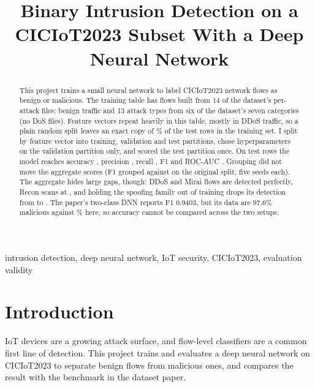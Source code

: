 \documentclass[conference]{IEEEtran}
\begin{document}
\title{Binary Intrusion Detection on a CICIoT2023 Subset With a Deep Neural Network}

\author{
}

\maketitle

\begin{abstract}
This project trains a small neural network to label CICIoT2023 network flows as benign or malicious. The training table has \DupRows{} flows built from 14 of the dataset's per-attack files: benign traffic and 13 attack types from six of the dataset's seven categories (no DoS files). Feature vectors repeat heavily in this table, mostly in DDoS traffic, so a plain random split leaves an exact copy of \DupSeenOrigPct\% of the test rows in the training set. I split by feature vector into training, validation and test partitions, chose hyperparameters on the validation partition only, and scored the test partition once. On \NTest{} test rows the model reaches accuracy \MainAcc, precision \MainPrec, recall \MainRec, F1 \MainFOne{} and ROC-AUC \MainAuc. Grouping did not move the aggregate scores (F1 \SeedsBothGroupedFOneMean{} grouped against \SeedsBothRandomFOneMean{} on the original split, five seeds each). The aggregate hides large gaps, though: DDoS and Mirai flows are detected perfectly, Recon scans at \FamReconRate, and holding the spoofing family out of training drops its detection from \HoldSpoofingSeen{} to \HoldSpoofingOut. The paper's two-class DNN reports F1 0.9403, but its data are 97.6\% malicious against \TestMalPct\% here, so accuracy cannot be compared across the two setups.
\end{abstract}

\begin{IEEEkeywords}
intrusion detection, deep neural network, IoT security, CICIoT2023, evaluation validity
\end{IEEEkeywords}

\section{Introduction}
IoT devices are a growing attack surface, and flow-level classifiers are a common first line of detection. This project trains and evaluates a deep neural network on CICIoT2023 \cite{s23135941} to separate benign flows from malicious ones, and compares the result with the benchmark in the dataset paper.
\end{document}
